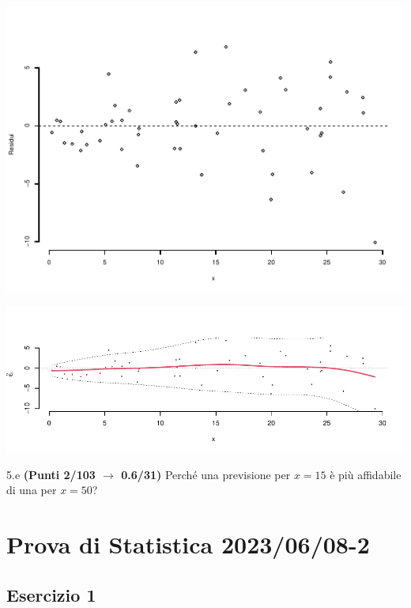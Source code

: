 \documentclass[
  11pt,
]{book}
\theoremstyle{mytheoremstyle}
\theoremstyle{mydefstyle}
\newenvironment{sol}
  {
  \begin{tcolorbox}[enhanced,breakable,arc=0.1mm,boxrule=1pt,colback=white,colframe=iblue,
  title=\bf \fontfamily{lmss}\selectfont \hspace{.5 cm} Soluzione,drop fuzzy shadow]

}{
\end{tcolorbox}
  }
\begin{document}
\begin{center}\includegraphics{Esami_passati_con_soluzioni_files/figure-latex/2023-39,-1} \end{center}

\begin{sol}

\begin{center}\includegraphics{Esami_passati_con_soluzioni_files/figure-latex/2023-40,-1} \end{center}

\end{sol}

5.e \textbf{(Punti 2/103 \(\rightarrow\) 0.6/31)} Perché una previsione per \(x=15\) è più affidabile di una per \(x=50\)?

\section{Prova di Statistica 2023/06/08-2}\label{prova-di-statistica-20230608-2}

\subsection{Esercizio 1}\label{esercizio-1-27}
\end{document}
